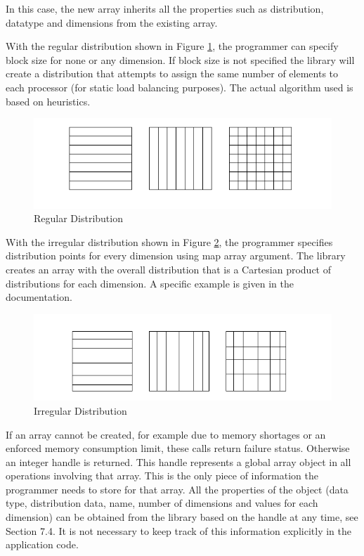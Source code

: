 In this case, the new array inherits all the properties such as distribution,
datatype and dimensions from the existing array.

With the regular distribution shown in Figure \ref{cap:RegularDistribution},
the programmer can specify block size for none or any dimension. If block size
is not specified the library will create a distribution that attempts to assign
the same number of elements to each processor (for static load balancing
purposes). The actual algorithm used is based on heuristics.

\begin{figure}
\begin{centering}
\includegraphics[width=0.9\columnwidth]{distr-1}
\caption{Regular Distribution}
\label{cap:RegularDistribution}
\end{centering}
\end{figure}

With the irregular distribution shown in Figure
\ref{cap:IrregularDistribution}, the programmer specifies distribution points
for every dimension using map array argument. The library creates an array with
the overall distribution that is a Cartesian product of distributions for each
dimension. A specific example is given in the documentation.

\begin{figure}
\begin{centering}
\includegraphics[width=0.9\columnwidth]{distr-2}
\caption{Irregular Distribution}
\label{cap:IrregularDistribution}
\end{centering}
\end{figure}

If an array cannot be created, for example due to memory shortages or an
enforced memory consumption limit, these calls return failure status. Otherwise
an integer handle is returned. This handle represents a global array object in
all operations involving that array. This is the only piece of information the
programmer needs to store for that array. All the properties of the object
(data type, distribution data, name, number of dimensions and values for each
dimension) can be obtained from the library based on the handle at any time,
see Section 7.4. It is not necessary to keep track of this information
explicitly in the application code.

